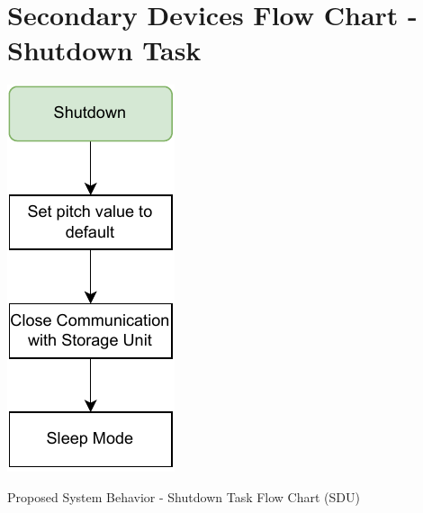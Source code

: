 
\chapter{Secondary Devices Flow Chart - Shutdown Task} %

\label{AppendixH}

\begin{algorithm}[H]
    \centering
    \includegraphics[scale=1]{appendices/assets/SDU_SHUTDOWN.pdf}
    \caption{Proposed System Behavior - Shutdown Task Flow Chart (SDU)}
    \label{alg:SDU_SHUTDOWN}
\end{algorithm}

